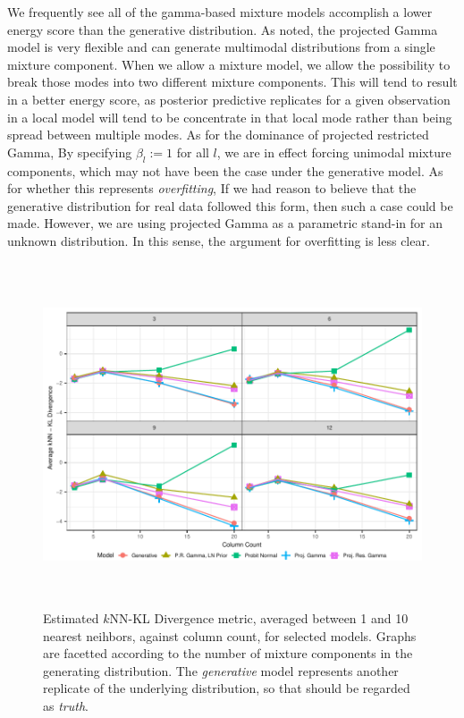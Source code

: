 We frequently see all of the gamma-based mixture models accomplish a lower energy score than the generative
  distribution.  As \cite{nunez2019} noted, the projected Gamma model is very flexible and can generate
  multimodal distributions from a single mixture component.  When we allow a mixture model, we allow
  the possibility to break those modes into two different mixture components.  This will tend to
  result in a better energy score, as posterior predictive replicates for a given observation in a local
  model will tend to be concentrate in that local mode rather than being spread between multiple
  modes.  As for the dominance of projected restricted Gamma, By specifying $\beta_l := 1$ for all
  $l$, we are in effect forcing unimodal mixture components, which may not have been the case under
  the generative model.  As for whether this represents \emph{overfitting}, If we had reason to
  believe that the generative distribution for real data followed this form, then such a case could
  be made.  However, we are using projected Gamma as a parametric stand-in for an unknown distribution.
  In this sense, the argument for overfitting is less clear.

\begin{figure}[h]
  \label{fig:simkld}
  \caption{Estimated $k$NN-KL Divergence metric, averaged between 1 and 10 nearest neihbors, against
      column count, for selected models.  Graphs are facetted according to the number of mixture
      components in the generating distribution.  The \emph{generative} model represents another
      replicate of the underlying distribution, so that should be regarded as \emph{truth}.}
  \includegraphics[width = 6in, height = 4in]{./images/simulation_knn_kld}
\end{figure}


